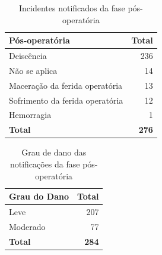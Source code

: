 \documentclass[
  a4paper]{article}
\begin{document}
\begin{table}[H]

\caption{\label{tab:unnamed-chunk-40}Notificação de acordo com as fases do Procedimento Cirúrgico}
\centering
{}
\end{table}

\begin{table}[H]

\caption{\label{tab:unnamed-chunk-41}Incidentes notificados da fase pós-operatória}
\centering
\begin{tabular}[t]{lr}
\toprule
Pós-operatória & Total\\
\midrule
Deiscência & 236\\
Não se aplica & 14\\
Maceração da ferida operatória & 13\\
Sofrimento da ferida operatória & 12\\
Hemorragia & 1\\
\midrule
\addlinespace
\textbf{Total} & \textbf{276}\\
\bottomrule
\end{tabular}
\end{table}

\begin{table}[H]

\caption{\label{tab:unnamed-chunk-42}Grau de dano das notificações da fase pós-operatória}
\centering
\begin{tabular}[t]{lr}
\toprule
Grau do Dano & Total\\
\midrule
Leve & 207\\
Moderado & 77\\
\midrule
\textbf{Total} & \textbf{284}\\
\bottomrule
\end{tabular}
\end{table}
\end{document}
